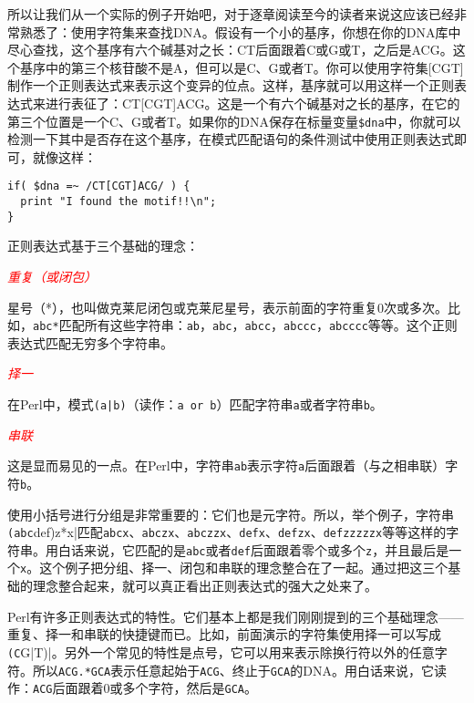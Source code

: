 所以让我们从一个实际的例子开始吧，对于逐章阅读至今的读者来说这应该已经非常熟悉了：使用字符集来查找DNA。假设有一个小的基序，你想在你的DNA库中尽心查找，这个基序有六个碱基对之长：CT后面跟着C或G或T，之后是ACG。这个基序中的第三个核苷酸不是A，但可以是C、G或者T。你可以使用字符集[CGT]制作一个正则表达式来表示这个变异的位点。这样，基序就可以用这样一个正则表达式来进行表征了：CT[CGT]ACG。这是一个有六个碱基对之长的基序，在它的第三个位置是一个C、G或者T。如果你的DNA保存在标量变量\verb|$dna|中，你就可以检测一下其中是否存在这个基序，在模式匹配语句的条件测试中使用正则表达式即可，就像这样：

\begin{lstlisting}
if( $dna =~ /CT[CGT]ACG/ ) {
  print "I found the motif!!\n";
}
\end{lstlisting}

正则表达式基于三个基础的理念：

\textcolor{red}{\textit{重复（或闭包）}}
\begin{adjustwidth}{4em}{}
\hspace*{2em}星号（*），也叫做克莱尼闭包或克莱尼星号，表示前面的字符重复0次或多次。比如，\verb|abc*|匹配所有这些字符串：\verb|ab|，\verb|abc|，\verb|abcc|，\verb|abccc|，\verb|abcccc|等等。这个正则表达式匹配无穷多个字符串。
\end{adjustwidth}

\textcolor{red}{\textit{择一}}
\begin{adjustwidth}{4em}{}
\hspace*{2em}在Perl中，模式\verb=(a|b)=（读作：\verb|a or b|）匹配字符串\verb|a|或者字符串\verb|b|。
\end{adjustwidth}

\textcolor{red}{\textit{串联}}
\begin{adjustwidth}{4em}{}
\hspace*{2em}这是显而易见的一点。在Perl中，字符串\verb|ab|表示字符\verb|a|后面跟着（与之相串联）字符\verb|b|。
\end{adjustwidth}

使用小括号进行分组是非常重要的：它们也是元字符。所以，举个例子，字符串\verb|(abc|def)z*x|匹配\verb|abcx|、\verb|abczx|、\verb|abczzx|、\verb|defx|、\verb|defzx|、\verb|defzzzzzx|等等这样的字符串。用白话来说，它匹配的是\verb|abc|或者\verb|def|后面跟着零个或多个\verb|z|，并且最后是一个\verb|x|。这个例子把分组、择一、闭包和串联的理念整合在了一起。通过把这三个基础的理念整合起来，就可以真正看出正则表达式的强大之处来了。

Perl有许多正则表达式的特性。它们基本上都是我们刚刚提到的三个基础理念——重复、择一和串联的快捷键而已。比如，前面演示的字符集使用择一可以写成\verb|(C|G|T)|。另外一个常见的特性是点号，它可以用来表示除换行符以外的任意字符。所以\verb|ACG.*GCA|表示任意起始于\verb|ACG|、终止于\verb|GCA|的DNA。用白话来说，它读作：\verb|ACG|后面跟着0或多个字符，然后是\verb|GCA|。


